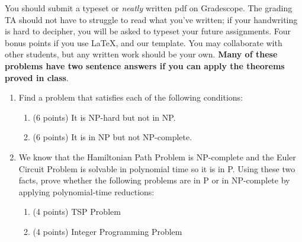 \documentclass[11pt]{article}
\begin{document}

You should submit a typeset or \emph{neatly} written pdf on Gradescope.  The grading TA should not have to struggle to read what you've written; if your handwriting is hard to decipher, you will be asked to typeset your future assignments. Four bonus points if you use \LaTeX, and our template. You may collaborate with other students, but any written work should be your own. \textbf{Many of these problems have two sentence answers if you can apply the theorems proved in class}.


\begin{enumerate} 

    \item Find a problem that satisfies each of the following conditions:

    \begin{enumerate}
        \item (6 points) It is NP-hard but not in NP.

        \begin{answer}
            
        \end{answer}
        
        \item (6 points) It is in NP but not NP-complete.

        \begin{answer}
            
        \end{answer}
    \end{enumerate}
    
    \item We know that the Hamiltonian Path Problem is NP-complete and the Euler Circuit Problem is solvable in polynomial time so it is in P. Using these two facts, prove whether the following problems are in P or in NP-complete by applying polynomial-time reductions:
    \begin{enumerate}
        \item (4 points) TSP Problem
    
        \begin{answer}
            
        \end{answer}
        
        \item (4 points) Integer Programming Problem
        

\end{enumerate}
\end{enumerate}
\end{document}
